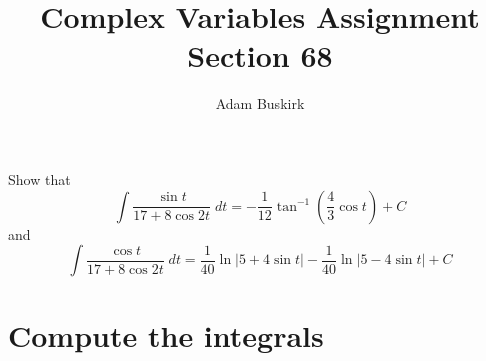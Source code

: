\documentclass{article}
\title{Complex Variables Assignment Section 68}
\author{Adam Buskirk}
\theoremstyle{definition}
\newcommand{\p}[1]{\left(#1\right)}
\newcommand{\abs}[1]{\left|#1\right|}
\begin{document}
\maketitle

Show that 
\[
\int \frac{\sin t}{17+8 \cos 2 t} \;dt = -\frac{1}{12} \tan^{-1}\p{\frac{4}{3} \cos t} + C
\]
and
\[
\int \frac{\cos t}{17+8 \cos 2t} \;dt 
= \frac{1}{40} \ln \abs{5+4\sin t} - \frac{1}{40} \ln\abs{5-4\sin t} + C
\]

\section{Compute the integrals}
\end{document}
